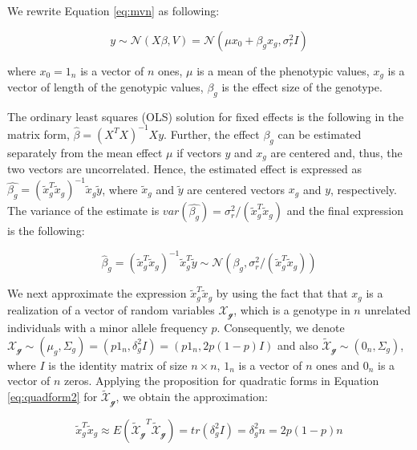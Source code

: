 \documentclass[]{book}
\begin{document}
We rewrite Equation \eqref{eq:mvn} as following:

\begin{equation}
  y \sim \mathcal{N} (X \beta, V) = \mathcal{N} (\mu x_0 + \beta_g x_g, \sigma_r^2 I) 
\label{eq:lmg}
\end{equation}

where \(x_0 = 1_n\) is a vector of \(n\) ones, \(\mu\) is a mean of the
phenotypic values, \(x_g\) is a vector of length of the genotypic
values, \(\beta_g\) is the effect size of the genotype.

The ordinary least squares (OLS) solution for fixed effects is the
following in the matrix form, \(\hat{\beta} = (X^T X)^{-1} X y\).
Further, the effect \(\beta_g\) can be estimated separately from the
mean effect \(\mu\) if vectors \(y\) and \(x_g\) are centered and, thus,
the two vectors are uncorrelated. Hence, the estimated effect is
expressed as
\(\hat{\beta_g} = \left(\tilde{x}_g^T \tilde{x}_g\right)^{-1} \tilde{x}_g \tilde{y}\),
where \(\tilde{x}_g\) and \(\tilde{y}\) are centered vectors \(x_g\) and
\(y\), respectively. The variance of the estimate is
\(var(\hat{\beta_g}) = \sigma_r^2 / (\tilde{x}_g^T \tilde{x}_g)\) and
the final expression is the following:

\begin{equation}
  \hat{\beta}_g  = \left(\tilde{x}_g^T \tilde{x}_g\right)^{-1} \tilde{x}_g^T \tilde{y} \sim \mathcal{N} (\beta_g, \sigma_r^2 / (\tilde{x}_g^T \tilde{x}_g))
\label{eq:betahatlmg}
\end{equation}

We next approximate the expression \(\tilde{x}_g^T \tilde{x}_g\) by
using the fact that that \(x_g\) is a realization of a vector of random
variables \(\mathcal{X_g}\), which is a genotype in \(n\) unrelated
individuals with a minor allele frequency \(p\). Consequently, we denote
\(\mathcal{X_g} \sim (\mu_g, \Sigma_g) = (p 1_n, \delta_g^2 I) = (p 1_n, 2 p (1-p) I)\)
and also \(\mathcal{\tilde{X}_g} \sim (0_n, \Sigma_g)\), where \(I\) is
the identity matrix of size \(n \times n\), \(1_n\) is a vector of \(n\)
ones and \(0_n\) is a vector of \(n\) zeros. Applying the proposition
for quadratic forms in Equation \eqref{eq:quadform2} for
\(\mathcal{\tilde{X}_g}\), we obtain the approximation:

\begin{equation}
\tilde{x}_g^T \tilde{x}_g \approx E(\mathcal{\tilde{X}_g}^T \mathcal{\tilde{X}_g}) = tr(\delta_g^2 I) = \delta_g^2 n = 2 p (1 - p) n
\label{eq:varbetahatlmg}
\end{equation}
\end{document}
